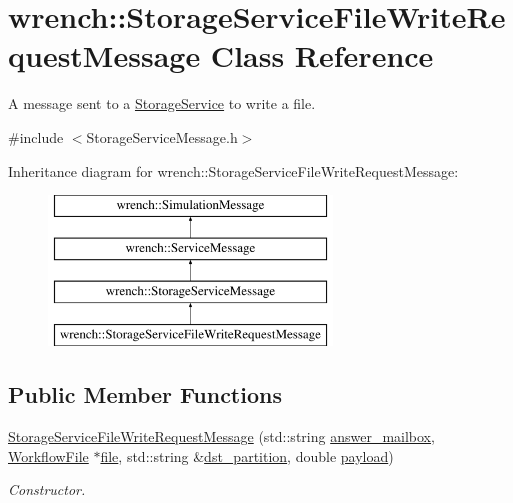 \hypertarget{classwrench_1_1_storage_service_file_write_request_message}{}\section{wrench\+:\+:Storage\+Service\+File\+Write\+Request\+Message Class Reference}
\label{classwrench_1_1_storage_service_file_write_request_message}


A message sent to a \hyperlink{classwrench_1_1_storage_service}{Storage\+Service} to write a file.  




{\ttfamily \#include $<$Storage\+Service\+Message.\+h$>$}

Inheritance diagram for wrench\+:\+:Storage\+Service\+File\+Write\+Request\+Message\+:\begin{figure}[H]
\begin{center}
\leavevmode
\includegraphics[height=4.000000cm]{classwrench_1_1_storage_service_file_write_request_message}
\end{center}
\end{figure}
\subsection*{Public Member Functions}
\begin{DoxyCompactItemize}
\item 
\hyperlink{classwrench_1_1_storage_service_file_write_request_message_a767efd7e4caab4b9e3d74592a1869f36}{Storage\+Service\+File\+Write\+Request\+Message} (std\+::string \hyperlink{classwrench_1_1_storage_service_file_write_request_message_aa09f6fbead99443ef62fa13a6f797412}{answer\+\_\+mailbox}, \hyperlink{classwrench_1_1_workflow_file}{Workflow\+File} $\ast$\hyperlink{classwrench_1_1_storage_service_file_write_request_message_a1e7b3431bbb6d82daeba75fd44eb84ed}{file}, std\+::string \&\hyperlink{classwrench_1_1_storage_service_file_write_request_message_a773acda112ce5b0e9740a2471da7d470}{dst\+\_\+partition}, double \hyperlink{classwrench_1_1_simulation_message_a914f2732713f7c02898e66f05a7cb8a1}{payload})
\begin{DoxyCompactList}\small\item\em Constructor. \end{DoxyCompactList}\end{DoxyCompactItemize}
